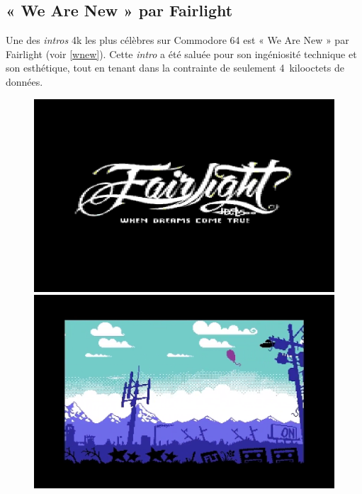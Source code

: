 \subsection*{« We Are New » par Fairlight}
Une des \textit{intros} 4k les plus célèbres sur Commodore 64 est « We Are New » par Fairlight (voir \ref{wnew}). Cette \textit{intro} a été saluée pour son ingéniosité technique et son esthétique, tout en tenant dans la contrainte de seulement 4~kilooctets de données.
\begin{figure}[h]
  \begin{minipage}[b]{0.30\linewidth}
    \centering
    \includegraphics[width=\linewidth]{images/demoscene/demos/wnew1.png}
  \end{minipage}
  \hfill
  \begin{minipage}[b]{0.30\linewidth}
    \centering
    \includegraphics[width=\linewidth]{images/demoscene/demos/wnew2.png}
  \end{minipage}

\end{figure}
